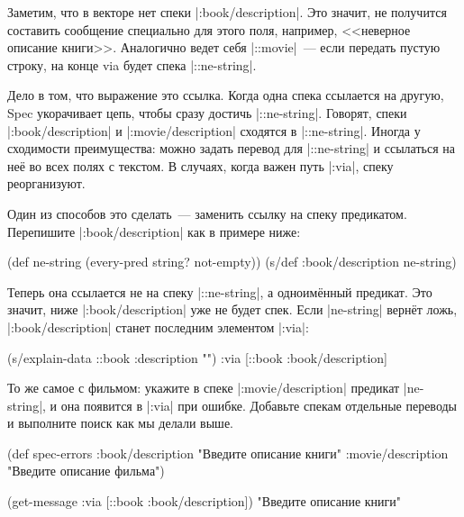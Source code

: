 Заметим, что в векторе нет спеки \spverb|:book/description|. Это значит, не
получится составить сообщение специально для этого поля, например, <<неверное
описание книги>>. Аналогично ведет себя \spverb|::movie|~--- если передать
пустую строку, на конце via будет спека \spverb|::ne-string|.

Дело в том, что выражение 
это ссылка. Когда одна спека ссылается на другую, Spec укорачивает цепь, чтобы
сразу достичь \spverb|::ne-string|. Говорят, спеки \spverb|:book/description| и
\spverb|:movie/description| сходятся в \spverb|::ne-string|. Иногда у сходимости
преимущества: можно задать перевод для \spverb|::ne-string| и ссылаться на
не\"{е} во всех полях с текстом. В случаях, когда важен путь \spverb|:via|,
спеку реорганизуют.

Один из способов это сделать~--- заменить ссылку на спеку предикатом. Перепишите
\spverb|:book/description| как в примере ниже:

\begin{english}
  \begin{clojure}
(def ne-string (every-pred string? not-empty))
(s/def :book/description ne-string)
  \end{clojure}
\end{english}

Теперь она ссылается не на спеку \spverb|::ne-string|, а одноим\"{е}нный
предикат. Это значит, ниже \spverb|:book/description| уже не будет спек. Если
\spverb|ne-string| верн\"{е}т ложь, \spverb|:book/description| станет последним
элементом \spverb|:via|:

\begin{english}
  \begin{clojure}
(s/explain-data ::book {:description ""})
{:via [::book :book/description]}
  \end{clojure}
\end{english}

То же самое с фильмом: укажите в спеке \spverb|:movie/description| предикат
\spverb|ne-string|, и она появится в \spverb|:via| при ошибке. Добавьте спекам
отдельные переводы и выполните поиск как мы делали выше.

  \begin{clojure}
(def spec-errors
  {:book/description "Введите описание книги"
   :movie/description "Введите описание фильма"})

(get-message {:via [::book :book/description]})
"Введите описание книги"
  \end{clojure}

